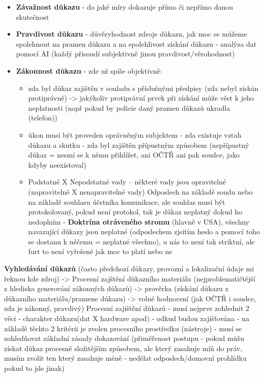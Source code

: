 \begin{itemize}
    \item \textbf{Závažnost důkazu} - do jaké míry dokazuje přímo či nepřímo danou skutečnost
    \item \textbf{Pravdivost důkazu} - důvěryhodnost zdroje důkazu, jak moc se můžeme spolehnout na pramen důkazu a na spolehlivost získání důkazu - analýza dat pomocí AI (každý přisoudí subjektivně jinou pravdivost/věrohodnost)
    \item \textbf{Zákonnost důkazu} - zde už spíše objektivně:
    \begin{itemize}
        \item  zda byl důkaz zajištěn v souladu s příslušnými předpisy (zda nebyl získán protiprávně) -> jakýkoliv protiprávní prvek při získání může věst k jeho neplatnosti (např pokud by policie daný pramen důkazů ukradla (telefon))
        \item úkon musí být proveden oprávněným subjektem - zda existuje vztah důkazu a skutku - zda byl zajištěn přípustným způsobem (nepřípustný důkaz = nesmí se k němu přihlížet, ani OČTŘ ani pak soudce, jako kdyby neexistoval)
        \item Podstatné X Nepodstatné vady -- některé vady jsou opravitelné (napravitelné X nenapravitelné vady) \newline
        Odposlech na základě soudu nebo na základě souhlasu účstníka komunikace, ale souhlas musí být protokolovaný, pokud není protokol, tak je důkaz neplatný dokud ho nedoplním - \textbf{Doktrína otráveného stromu} (hlavně v USA), všechny navazující důkazy jsou neplatné (odposlechem zjsitím heslo a pomocí toho se dostanu k něčemu = neplatné všechno), u nás to není tak striktní, ale furt to není vyřešené jak moc to platí nebo ne
    \end{itemize} 
\end{itemize}

\textbf{Vyhledávání důkazů} (často předchozí důkazy, provozní a lokalizační údaje mi řeknou kde zdroj) ->
Procesní zajštění důkazního materiálu (nejproblematičtější z hlediska generování zákonných důkazů) -> prověrka (získání důkazu z důkazního materiálu/pramene důkazu) -> volné hodnocení (jak OČTŘ i soudce, zda je zákonný, pravdivý) \newline
Procesní zajištění důkazů - musí nejprve zohlednit 2 věci - charakter důkazu(dat X hardware apod) - odkud budou zajišťována - na základě těchto 2 kritérii je zvolen procesního prostředku (nástroje) - musí se zohledňovat základní zásady dokazování (přiměřenost postupu - pokud můžu získat důkaz procesně složitějším způsobem, ale který zasahuje míň do práv, musím zvolit ten který zasahuje méně - nedělat odposlech/domovní prohlídku pokud to jde jinak)

